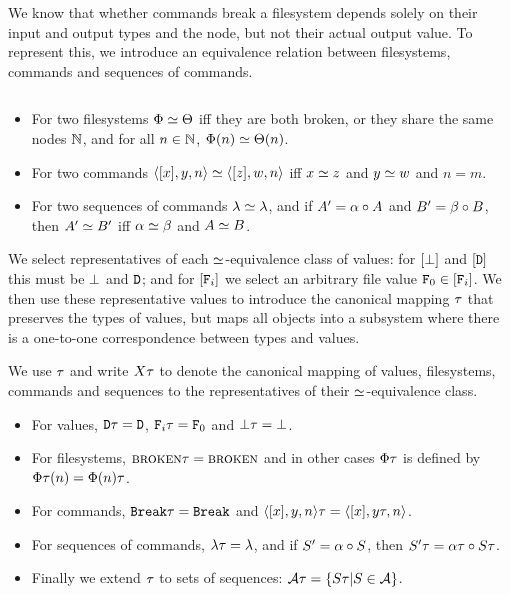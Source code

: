 \bigskip


\noindent
We know that whether commands break a filesystem depends solely on their input and output
types and the node, but not their actual output value.
To represent this, we introduce an equivalence relation between filesystems, commands
and sequences of commands.
\begin{mydef}
$ $ %
\begin{itemize}
\item For two filesystems $\Phi\simeq\Theta$ iff they are both broken, or they share the same nodes $\mathbb{N}$,
and for all $n\in\mathbb{N}$, $\Phi(n) \simeq \Theta(n)$.
\item For two commands $\langle{[x],y,n}\rangle\simeq\langle{[z],w,n}\rangle$ iff 
$x\simeq z$ and $y\simeq w$ and $n=m$.
\item For two sequences of commands $\lambda\simeq\lambda$, and
if $A'=\alpha\circ A$ and $B'=\beta\circ B$, then $A'\simeq B'$ iff $\alpha\simeq\beta$ and $A\simeq B$.
\end{itemize}
\end{mydef}

We select representatives of each $\simeq$-equivalence class of values:
for $[\bot]$ and $[\mathtt{D}]$ this must be $\bot$ and $\mathtt{D}$; and
for $[\mathtt{F}_i]$ we select an arbitrary file value $\mathtt{F}_0\in[\mathtt{F}_i]$.
We then use these representative values to
introduce the canonical mapping $\T$ that preserves the types of values,
but maps all objects into a subsystem where there is a one-to-one
correspondence between types and values.

\begin{mydef}[$\T$]
We use $\T$ and write $X\tau$ to denote the canonical mapping of 
values, filesystems, commands and sequences to the
representatives of their $\simeq$-equivalence class.
\begin{itemize}
\item For values, $\mathtt{D}\tau=\mathtt{D}$, $\mathtt{F}_i\tau=\mathtt{F}_0$ and $\bot\tau=\bot$.
\item For filesystems, $\text{\normalfont\scshape{broken}}\tau=\text{\normalfont\scshape{broken}}$ and in other cases $\Phi\tau$ is defined by $\Phi\tau(n) = \Phi(n)\tau$.
\item For commands, $\mathtt{Break}\tau=\mathtt{Break}$ and $\langle{[x],y,n}\rangle\tau = \langle{[x],{y}\tau,n}\rangle$.
\item For sequences of commands, $\lambda\tau=\lambda$, and if $S'=\alpha\circ S$, then $S'\tau=\alpha\tau\circ S\tau$.
\item Finally we extend $\T$ to sets of sequences: $\mathcal{A}\tau = \{S\tau | S\in\mathcal{A}\}$.
\end{itemize}
\end{mydef}

